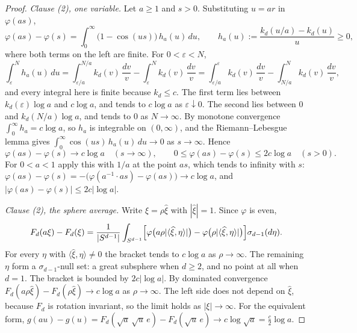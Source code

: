 \begin{proof}
\emph{Clause (2), one variable.} Let $a \ge 1$ and $s > 0$. Substituting $u = ar$ in
$\varphi(as)$,
\[
  \varphi(as) - \varphi(s) = \int_0^\infty \bigl(1 - \cos(us)\bigr)\,h_a(u)\,du ,
  \qquad h_a(u) := \frac{k_d(u/a) - k_d(u)}{u} \ge 0 ,
\]
where both terms on the left are finite. For $0 < \varepsilon < N$,
\[
  \int_\varepsilon^N h_a(u)\,du = \int_{\varepsilon/a}^{N/a}k_d(v)\,\frac{dv}{v}
     - \int_\varepsilon^N k_d(v)\,\frac{dv}{v}
   = \int_{\varepsilon/a}^{\varepsilon}k_d(v)\,\frac{dv}{v} - \int_{N/a}^{N}k_d(v)\,\frac{dv}{v} ,
\]
and every integral here is finite because $k_d \le c$. The first term lies between
$k_d(\varepsilon)\log a$ and $c\log a$, and tends to $c\log a$ as $\varepsilon \downarrow 0$. The
second lies between $0$ and $k_d(N/a)\log a$, and tends to $0$ as $N \to \infty$. By monotone
convergence $\int_0^\infty h_a = c\log a$, so $h_a$ is integrable on $(0,\infty)$, and the
Riemann--Lebesgue lemma gives $\int_0^\infty\cos(us)\,h_a(u)\,du \to 0$ as $s \to \infty$. Hence
\[
  \varphi(as) - \varphi(s) \to c\log a \quad (s \to \infty),
  \qquad 0 \le \varphi(as) - \varphi(s) \le 2c\log a \quad (s > 0).
\]
For $0 < a < 1$ apply this with $1/a$ at the point $as$, which tends to infinity with $s$:
$\varphi(as) - \varphi(s) = -\bigl(\varphi(a^{-1}\cdot as) - \varphi(as)\bigr) \to c\log a$, and
$|\varphi(as) - \varphi(s)| \le 2c|\log a|$.

\emph{Clause (2), the sphere average.} Write $\xi = \rho\widehat\xi$ with $|\widehat\xi| = 1$.
Since $\varphi$ is even,
\[
  F_d(a\xi) - F_d(\xi) = \frac{1}{|S^{d-1}|}\int_{S^{d-1}}
    \Bigl[\varphi\bigl(a\rho|\langle\widehat\xi,\eta\rangle|\bigr)
      - \varphi\bigl(\rho|\langle\widehat\xi,\eta\rangle|\bigr)\Bigr]
    \sigma_{d-1}(d\eta) .
\]
For every $\eta$ with $\langle\widehat\xi,\eta\rangle \ne 0$ the bracket tends to $c\log a$ as
$\rho \to \infty$. The remaining $\eta$ form a $\sigma_{d-1}$-null set: a great subsphere when
$d \ge 2$, and no point at all when $d = 1$. The bracket is bounded by $2c|\log a|$. By dominated
convergence $F_d(a\rho\widehat\xi) - F_d(\rho\widehat\xi) \to c\log a$ as $\rho \to \infty$. The
left side does not depend on $\widehat\xi$, because $F_d$ is rotation invariant, so the limit holds
as $|\xi| \to \infty$. For the equivalent form, $g(au) - g(u) = F_d(\sqrt a\,\sqrt u\,e) -
F_d(\sqrt u\,e) \to c\log\sqrt a = \tfrac c2\log a$.
\end{proof}

